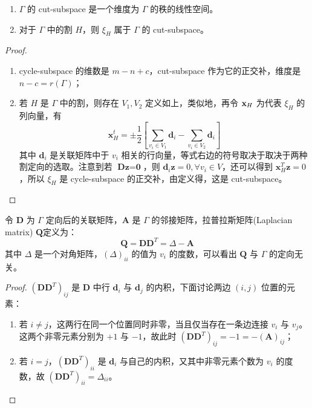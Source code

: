 \begin{proposition}
\begin{enumerate}
    \item $\Gamma$ 的 cut-subspace 是一个维度为 $\Gamma$ 的秩的线性空间。
    \item 对于 $\Gamma$ 中的割 $H$，则 $\xi_H$ 属于 $\Gamma$ 的 cut-subspace。
\end{enumerate}
\end{proposition}
\begin{proof}
\begin{enumerate}
    \item cycle-subspace 的维数是 $m - n + c$，cut-subspace 作为它的正交补，维度是 $n - c = r(\Gamma)$；
    \item 若 $H$ 是 $\Gamma$ 中的割，则存在 $V_1, V_2$ 定义如上，类似地，再令 $\textbf x_H$ 为代表 $\xi_H$ 的列向量，有
    \[
        \mathbf{x}_{H}^{t} = \pm \frac{1}{2}\left[\sum_{v_{i} \in V_{1}} \mathbf{d}_{i}-\sum_{v_{i} \in V_{2}} \mathbf{d}_{i}\right]
    \]
    其中 $\textbf{d}_i$ 是关联矩阵中于 $v_i$ 相关的行向量，等式右边的符号取决于取决于两种割定向的选取。注意到若 $\textbf{Dz} = \textbf{0}$，则 $\textbf{d}_i \textbf{z} = 0, \forall v_i\in V$，还可以得到 $\mathbf{x}_{H}^{T} \textbf{z} = 0$，所以 $\xi_H$ 是 cycle-subspace 的正交补，由定义得，这是 cut-subspace。
\end{enumerate}
\end{proof}

\begin{definition}
令 $\textbf{D}$ 为 $\Gamma$ 定向后的关联矩阵，$\textbf{A}$ 是 $\Gamma$ 的邻接矩阵，拉普拉斯矩阵(Laplacian matrix) $\textbf{Q}$定义为：
\[
\textbf{Q} = \textbf{DD}^T = \Delta - \textbf{A}
\]
其中 $\Delta$ 是一个对角矩阵，${(\Delta)}_{ii}$ 的值为 $v_i$ 的度数，可以看出 $\textbf{Q}$ 与 $\Gamma$ 的定向无关。
\end{definition}
\begin{proof}
$(\textbf{DD}^T)_{i j}$ 是 $\textbf{D}$ 中行 $\textbf{d}_i$ 与 $\textbf{d}_j$ 的内积，下面讨论两边 $(i,j)$ 位置的元素：
\begin{enumerate}
    \item 若 $i \neq j$，这两行在同一个位置同时非零，当且仅当存在一条边连接 $v_i$ 与 $v_j$。这两个非零元素分别为 $+1$ 与 $-1$，故此时 $(\textbf{DD}^T)_{i j} = -1 = -(\textbf{A})_{i j}$；
    \item 若 $i = j$，$(\textbf{DD}^T)_{i i}$ 是 $\textbf{d}_i$ 与自己的内积，又其中非零元素个数为 $v_i$ 的度数，故 $(\textbf{DD}^T)_{i i} = \Delta_{i i}$。
\end{enumerate}
\end{proof}

